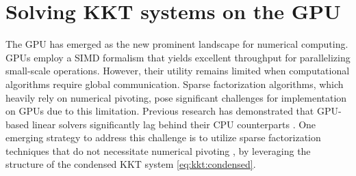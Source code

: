 \section{Solving KKT systems on the GPU}
The GPU has emerged as the new prominent landscape for numerical computing.
GPUs employ a SIMD formalism that yields excellent throughput for parallelizing small-scale operations.
However, their utility remains limited when computational algorithms require global communication.
Sparse factorization algorithms, which heavily rely on numerical pivoting, pose significant challenges for implementation on GPUs due to this limitation. Previous research has demonstrated that GPU-based linear solvers significantly lag behind their CPU counterparts \cite{tasseff2019exploring,swirydowicz2021linear}.
One emerging strategy to address this challenge is to utilize sparse factorization techniques that do not necessitate numerical pivoting \cite{regev2023hykkt,shin2023accelerating},
by leveraging the structure of the condensed KKT system \eqref{eq:kkt:condensed}.

